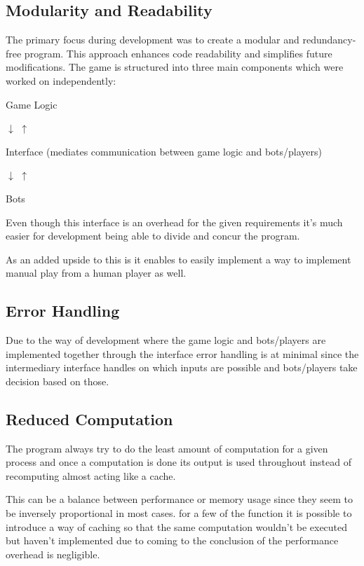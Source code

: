 \documentclass{article}
\begin{document}
\subsection{Modularity and Readability}

The primary focus during development was to create a modular and redundancy-free program. This approach enhances code readability and simplifies future modifications. The game is structured into three main components which were worked on independently:

\begin{center}
    \item[Game Logic]
    \item[{$\downarrow$} {$\uparrow$}]
    \item [Interface (mediates communication between game logic and bots/players)]
    \item[{$\downarrow$} {$\uparrow$}]
    \item[Bots]
\end{center}

Even though this interface is an overhead for the given requirements it's much easier for development being able to divide and concur the program.  

As an added upside to this is it enables to easily implement a way to implement manual play from a human player as well.  

\subsection{Error Handling}

Due to the way of development where the game logic and bots/players are implemented together through the interface error handling is at minimal since the intermediary interface handles on which inputs are possible and bots/players take decision based on those.

\subsection{Reduced Computation}

The program always try to do the least amount of computation for a given process and once a computation is done its output is used throughout instead of recomputing almost acting like a cache.

This can be a balance between performance or memory usage since they seem to be inversely proportional in most cases. for a few of the function it is possible to introduce a way of caching so that the same computation wouldn't be executed but haven't implemented due to coming to the conclusion of the performance overhead is negligible.
\end{document}
